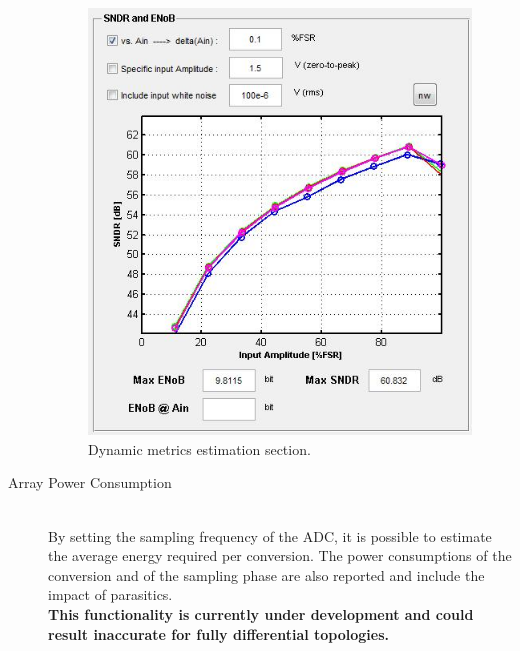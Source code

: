 \begin{description}
\begin{figure}[h!]
	\centering
	\includegraphics[scale=0.65]{pics/dynamic.jpg}
	\caption{Dynamic metrics estimation section.}
	\label{fig:dynamic}
\end{figure}

	\item[Array Power Consumption] \hfill \\
	By setting the sampling frequency of the ADC, it is possible to estimate the average energy required per conversion. The power consumptions of the conversion and of the sampling phase are also reported and include the impact of parasitics. \\ \textbf{This functionality is currently under development and could result  inaccurate for fully differential topologies.}
	
\end{description}